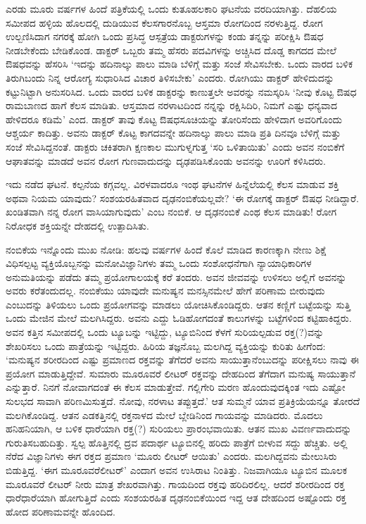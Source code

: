 
ಎರಡು ಮೂರು ವರ್ಷಗಳ ಹಿಂದೆ ಪತ್ರಿಕೆಯಲ್ಲಿ ಒಂದು ಕುತೂಹಲಕಾರಿ ಘಟನೆಯ ವರದಿ\-ಯಾಗಿತ್ತು. ದೆಹಲಿಯ ಸಮೀಪದ ಹಳ್ಳಿಯ ಹೊಲದಲ್ಲಿ ದುಡಿಯುವ ಕೆಲಸಗಾರನೊಬ್ಬ ಆಸ್ತಮಾ ರೋಗದಿಂದ ನರಳುತ್ತಿದ್ದ. ರೋಗ ಉಲ್ಬಣಿಸಿದಾಗ ನಗರಕ್ಕೆ ಹೋಗಿ ಒಂದು ಪ್ರಸಿದ್ಧ ಆಸ್ಪತ್ರೆಯ ಡಾಕ್ಟರುಗಳನ್ನು ಕಂಡು ತನ್ನನ್ನು ಪರೀಕ್ಷಿಸಿ ಔಷಧ ನೀಡಬೇಕೆಂದು ಬೇಡಿಕೊಂಡ. ಡಾಕ್ಟರ್ ಒಬ್ಬರು ತಮ್ಮ ಹೆಸರು ಪದವಿಗಳನ್ನು ಅಚ್ಚಿಸಿದ ದೊಡ್ಡ ಕಾಗದದ ಮೇಲೆ ಔಷಧವನ್ನು ಹೆಸರಿಸಿ ‘ಇದನ್ನು ಹದಿನಾಲ್ಕು ಪಾಲು ಮಾಡಿ ಬೆಳಿಗ್ಗೆ ಮತ್ತು ಸಂಜೆ ಸೇವಿಸಬೇಕು. ಒಂದು ವಾರದ ಬಳಿಕ ತಿರುಗಿಬಂದು ನಿನ್ನ ಆರೋಗ್ಯ ಸುಧಾರಿಸಿದ ವಿಚಾರ ತಿಳಿಸಬೇಕು’ ಎಂದರು. ರೋಗಿಯು ಡಾಕ್ಟರ್ ಹೇಳಿದುದನ್ನು ಕಟ್ಟುನಿಟ್ಟಾಗಿ ಅನುಸರಿಸಿದ. ಒಂದು ವಾರದ ಬಳಿಕ ಡಾಕ್ಟರನ್ನು ಕಾಣುತ್ತಲೇ ಅವರನ್ನು ನಮಸ್ಕರಿಸಿ ‘ನೀವು ಕೊಟ್ಟ ಔಷಧ ರಾಮಬಾಣದ ಹಾಗೆ ಕೆಲಸ ಮಾಡಿತು. ಆಸ್ತಮಾದ ನರಳಾಟದಿಂದ ನನ್ನನ್ನು ರಕ್ಷಿಸಿದಿರಿ, ನಿಮಗೆ ಎಷ್ಟು ಧನ್ಯವಾದ ಹೇಳಿದರೂ ಕಡಿಮೆ’ ಎಂದ. ಡಾಕ್ಟರ್ ತಾವು ಕೊಟ್ಟ ಔಷಧಸೂಚಿಯನ್ನು ತೋರಿಸೆಂದು ಹೇಳಿದಾಗ ಅವರಿಗೊಂದು ಆಶ್ಚರ್ಯ ಕಾದಿತ್ತು. ಅವನು ಡಾಕ್ಟರ್ ಕೊಟ್ಟ ಕಾಗದವನ್ನೇ ಹದಿನಾಲ್ಕು ಪಾಲು ಮಾಡಿ ಪ್ರತಿ ದಿನವೂ ಬೆಳಿಗ್ಗೆ ಮತ್ತು ಸಂಜೆ ಸೇವಿಸಿದ್ದನಂತೆ. ಡಾಕ್ಟರು ಚಕಿತರಾಗಿ ಕ್ಷಣಕಾಲ ಮುಗುಳ್ನಗುತ್ತ ‘ಸರಿ ಒಳಿತಾಯಿತು’ ಎಂದು ಅವನ ನಂಬಿಕೆಗೆ ಆಘಾತವನ್ನು ಮಾಡದೆ ಅವನ ರೋಗ ಗುಣವಾದುದನ್ನು ದೃಢಪಡಿಸಿಕೊಂಡು ಅವನನ್ನು ಊರಿಗೆ ಕಳಿಸಿದರು.

ಇದು ನಡೆದ ಘಟನೆ. ಕಲ್ಪನೆಯ ಕಗ್ಗವಲ್ಲ. ವಿರಳವಾದರೂ ಇಂಥ ಘಟನೆಗಳ ಹಿನ್ನೆಲೆಯಲ್ಲಿ ಕೆಲಸ ಮಾಡುವ ಶಕ್ತಿ ಅಥವಾ ನಿಯಮ ಯಾವುದು? ಸಂಶಯರಹಿತವಾದ ದೃಢನಂಬಿಕೆಯಲ್ಲವೇ? ‘ಈ ರೋಗಕ್ಕೆ ಡಾಕ್ಟರ್ ಔಷಧ ನೀಡಿದ್ದಾರೆ. ಖಂಡಿತವಾಗಿ ನನ್ನ ರೋಗ ವಾಸಿಯಾಗುವುದು’ ಎಂಬ ನಂಬಿಕೆ. ಆ ದೃಢನಂಬಿಕೆ ಎಂಥ ಕೆಲಸ ಮಾಡಿತು! ರೋಗ ನಿರೋಧಕ ಶಕ್ತಿಯನ್ನೇ ದೇಹದಲ್ಲಿ ಉತ್ಪಾದಿಸಿತು.

ನಂಬಿಕೆಯ ಇನ್ನೊಂದು ಮುಖ ನೋಡಿ: ಹಲವು ವರ್ಷಗಳ ಹಿಂದೆ ಕೊಲೆ ಮಾಡಿದ ಕಾರಣಕ್ಕಾಗಿ ನೇಣು ಶಿಕ್ಷೆ ವಿಧಿಸಲ್ಪಟ್ಟ ವ್ಯಕ್ತಿಯೊಬ್ಬನನ್ನು ಮನೋವಿಜ್ಞಾನಿಗಳು ತಮ್ಮ ಒಂದು ಸಂಶೋಧನೆಗಾಗಿ ನ್ಯಾಯಾಧಿಕಾರಿಗಳ ಅನುಮತಿಯನ್ನು ಪಡೆದು ತಮ್ಮ ಪ್ರಯೋಗಾಲಯಕ್ಕೆ ಕರೆ ತಂದರು. ಅವನ ಜೀವವನ್ನು ಉಳಿಸಲು ಅಲ್ಲಿಗೆ ಅವನನ್ನು ಅವರು ಕರೆತಂದುದಲ್ಲ. ನಂಬಿಕೆಯು ಯಾವುದೇ ಮನುಷ್ಯನ ಮನಸ್ಸಿನಮೇಲೆ ಹೇಗೆ ಪರಿಣಾಮ ಬೀರುವುದು ಎಂಬುದನ್ನು ತಿಳಿಯಲು ಒಂದು ಪ್ರಯೋಗವನ್ನು ಮಾಡಲು ಯೋಚಿಸಿಕೊಂಡಿದ್ದರು. ಆತನ ಕಣ್ಣಿಗೆ ಬಟ್ಟೆಯನ್ನು ಸುತ್ತಿ ಒಂದು ಮೇಜಿನ ಮೇಲೆ ಮಲಗಿಸಿದ್ದರು. ಅವನು ಎದ್ದು ಓಡಿಹೋಗದಂತೆ ಕಾಲುಗಳನ್ನು ಬಟ್ಟೆಗಳಿಂದ ಕಟ್ಟಿಹಾಕಿದ್ದರು. ಅವನ ಕತ್ತಿನ ಸಮೀಪದಲ್ಲಿ ಒಂದು ಟ್ಯೂಬನ್ನು ಇಟ್ಟಿದ್ದು, ಟ್ಯೂಬಿನಿಂದ ಕೆಳಗೆ ಸುರಿಯಲ್ಪಡುವ ರಕ್ತ(?)ವನ್ನು ಶೇಖರಿಸಲು ಒಂದು ಪಾತ್ರೆಯನ್ನು ಇಟ್ಟಿದ್ದರು. ಹಿರಿಯ ತಜ್ಞನೊಬ್ಬ ಮಲಗಿದ್ದ ವ್ಯಕ್ತಿಯನ್ನು ಕುರಿತು ಹೀಗೆಂದ: ‘ಮನುಷ್ಯನ ಶರೀರದಿಂದ ಎಷ್ಟು ಪ್ರಮಾಣದ ರಕ್ತವನ್ನು ತೆಗೆದರೆ ಅವನು ಸಾಯುತ್ತಾನೆಂಬುದನ್ನು ಪರೀಕ್ಷಿಸಲು ನಾವು ಈ ಪ್ರಯೋಗ ಮಾಡುತ್ತಿದ್ದೇವೆ. ಸುಮಾರು ಮೂರೂವರೆ ಲೀಟರ್ ರಕ್ತವನ್ನು ದೇಹದಿಂದ ತೆಗೆದಾಗ ಮನುಷ್ಯ ಸಾಯುತ್ತಾನೆ ಎನ್ನುತ್ತಾರೆ. ನಿನಗೆ ನೋವಾಗದಂತೆ ಈ ಕೆಲಸ ಮಾಡುತ್ತೇವೆ. ಗಲ್ಲಿಗೇರಿ ಮರಣ ಹೊಂದುವುದಕ್ಕಿಂತ ಇದು ಎಷ್ಟೋ ಸುಲಭದ ಸಾವಾಗಿ ಪರಿಣಮಿಸುತ್ತದೆ. ನೋವು, ನರಳಾಟ ತಪ್ಪುತ್ತದೆ.’ ಆತ ಸುಮ್ಮನೆ ಯಾವ ಪ್ರತಿಕ್ರಿಯೆಯನ್ನೂ ತೋರದೆ ಮಲಗಿಕೊಂಡಿದ್ದ. ಆತನ ಎಡಕತ್ತಿನಲ್ಲಿ ರಕ್ತನಾಳದ ಮೇಲೆ ಬ್ಲೇಡಿನಿಂದ ಗಾಯವನ್ನು ಮಾಡಿದರು. ಮೊದಲು ಹನಿಹನಿಯಾಗಿ, ಆ ಬಳಿಕ ಧಾರೆಯಾಗಿ ರಕ್ತ(?) ಸುರಿಯಲು ಪ್ರಾರಂಭವಾಯಿತು. ಆತನ ಮುಖ ವಿವರ್ಣವಾದುದನ್ನು ಗುರುತಿಸಬಹುದಿತ್ತು. ಸ್ವಲ್ಪ ಹೊತ್ತಿನಲ್ಲಿ ದ್ರವ ಪದಾರ್ಥ ಟ್ಯೂಬಿನಲ್ಲಿ ಹರಿದು ಪಾತ್ರೆಗೆ ಬೀಳುವ ಸದ್ದು ಹೆಚ್ಚಿತು. ಅಲ್ಲಿ ನೆರೆದ ವಿಜ್ಞಾನಿಗಳು ಈಗ ರಕ್ತದ ಪ್ರಮಾಣ ‘ಮೂರು ಲೀಟರ್ ಆಯಿತು’ ಎಂದರು. ಮಲಗಿದ್ದವನು ಮೇಲುಸಿರು ಬಿಡುತ್ತಿದ್ದ. ‘ಈಗ ಮೂರೂವರೆಲೀಟರ್​’ ಎಂದಾಗ ಅವನ ಉಸಿರಾಟ ನಿಂತಿತ್ತು. ನಿಜವಾಗಿಯೂ ಟ್ಯೂಬಿನ ಮೂಲಕ ಮೂರೂವರೆ ಲೀಟರ್ ನೀರು ಮಾತ್ರ ಶೇಖರವಾಗಿತ್ತು. ಗಾಯದಿಂದ ರಕ್ತವು ಹರಿದಿರಲಿಲ್ಲ. ಆದರೆ ಶರೀರದಿಂದ ರಕ್ತ ಧಾರೆಧಾರೆಯಾಗಿ ಹೋಗುತ್ತಿದೆ ಎಂದು ಸಂಶಯರಹಿತ ದೃಢನಂಬಿಕೆಯಿಂದ ಇದ್ದ ಆತ ದೇಹದಿಂದ ಅಷ್ಟೊಂದು ರಕ್ತ ಹೋದ ಪರಿಣಾಮವನ್ನೇ ಹೊಂದಿದ.


